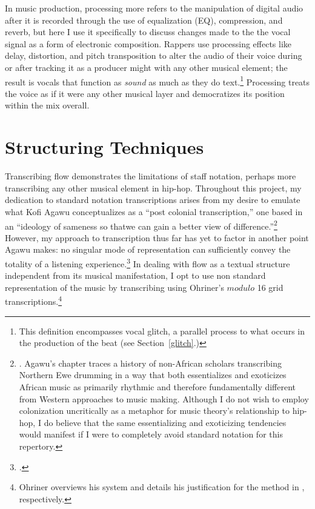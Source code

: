 In music production, processing more refers to the manipulation of digital audio after it is recorded
through the use of equalization (EQ), compression, and reverb, but here I use it specifically to discuss
changes made to the the vocal signal as a form of electronic composition. Rappers use processing effects
like delay, distortion, and pitch transposition to alter the audio of their voice during or after
tracking it as a producer might with any other musical element; the result is vocals that function as 
\emph{sound} as much as they do text.\footnote{
    This definition encompasses vocal glitch, a parallel process to what occurs in the production of 
    the beat (see Section~\ref{glitch}.)}
Processing treats the voice as if it were any other musical layer and democratizes its position within
the mix overall.

\section{Structuring Techniques}
Transcribing flow demonstrates the limitations of staff notation, perhaps more transcribing any other
musical element in hip-hop. Throughout this project, my dedication to standard notation transcriptions
arises from my desire to emulate what Kofi Agawu conceptualizes as a ``post  colonial transcription,''
one based in an ``ideology of sameness so that\textellipsis we can gain a better view of 
difference.''\footnote{
    \autocite[67]{kofiagawuInventionAfricanRhythm2003}. Agawu's chapter traces a history of 
    non-African scholars transcribing Northern Ewe drumming in a way that both essentializes
    and exoticizes African music as primarily rhythmic and therefore fundamentally different
    from Western approaches to music making. Although I do not wish to employ colonization 
    uncritically as a metaphor for music theory's relationship to hip-hop, I do believe that
    the same essentializing and exoticizing tendencies would manifest if I were to completely
    avoid standard notation for this repertory.}
However, my approach to transcription thus far has yet to factor in another point Agawu makes: no
singular mode of representation can sufficiently convey the totality of a listening 
experience.\footnote{
    \autocite[187]{kofiagawuAfricanRhythmNorthern1995}.}
In dealing with flow as a textual structure independent from its musical manifestation, 
I opt to use non standard representation of the music by transcribing using Ohriner's $modulo$ 16
grid transcriptions.\footnote{
    Ohriner overviews his system and details his justification for the method in 
    \autocite[xxviii--xl and 7--9]{mitchellohrinerFlowRhythmicVoice2019}, respectively.}

